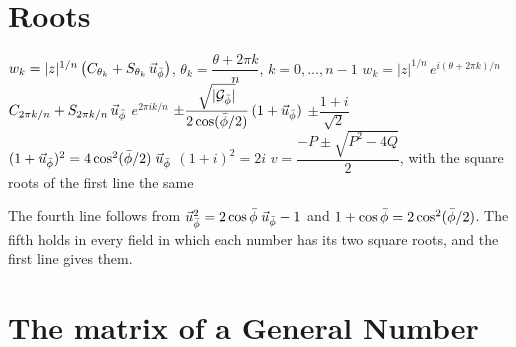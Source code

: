 \section{Roots}\label{app:f-roots}

\begin{gnlaws}
  {$w_k = |z|^{1/n}\,\bigl(C_{\theta_k} + S_{\theta_k}\,\vec{u}_{\bar{\phi}}\bigr)$, \quad $\theta_k = \dfrac{\theta + 2\pi k}{n}$, \quad $k = 0, \dots, n - 1$}
  {$w_k = |z|^{1/n}\,e^{i(\theta + 2\pi k)/n}$}
  {$C_{2\pi k/n} + S_{2\pi k/n}\,\vec{u}_{\bar{\phi}}$}
  {$e^{2\pi ik/n}$}
  {$\pm\dfrac{\sqrt{|\mathcal{G}_{\bar{\phi}}|}}{2\cos(\bar{\phi}/2)}\,(1 + \vec{u}_{\bar{\phi}})$}
  {$\pm\dfrac{1 + i}{\sqrt{2}}$}
  {$(1 + \vec{u}_{\bar{\phi}})^2 = 4\cos^2(\bar{\phi}/2)\;\vec{u}_{\bar{\phi}}$}
  {$(1 + i)^2 = 2i$}
  {$v = \dfrac{-P \pm \sqrt{P^2 - 4Q}}{2}$, with the square roots of the first line}
  {the same}
\end{gnlaws}
The fourth line follows from $\vec{u}_{\bar{\phi}}^2 = 2\cos\bar{\phi}\;\vec{u}_{\bar{\phi}} - 1$ and $1 + \cos\bar{\phi} = 2\cos^2(\bar{\phi}/2)$. The fifth holds in every field in which each number has its two square roots, and the first line gives them.

\section{The matrix of a General Number}\label{app:f-matrix}


